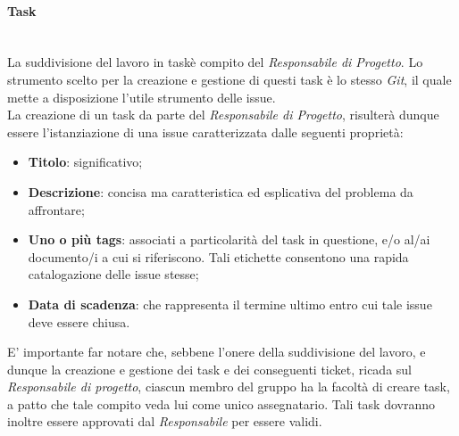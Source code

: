 \paragraph{Task} ~\\
	La suddivisione del lavoro in task\glossario è compito del \textit{Responsabile di Progetto}. Lo strumento scelto per la creazione e gestione di questi task è lo stesso \textit{Git}\glossario, il quale mette a disposizione l'utile strumento delle issue.\\
	La creazione di un task da parte del \textit{Responsabile di Progetto}, risulterà dunque essere l'istanziazione di una issue caratterizzata dalle seguenti proprietà:
	\begin{itemize}
	\item \textbf{Titolo}: significativo;
	\item \textbf{Descrizione}: concisa ma caratteristica ed esplicativa del problema da affrontare;
	\item \textbf{Uno o più tags}: associati a particolarità del task in questione, e/o al/ai documento/i a cui si riferiscono. Tali etichette consentono una rapida catalogazione delle issue stesse;
	\item \textbf{Data di scadenza}: che rappresenta il termine ultimo entro cui tale issue deve essere chiusa.
	\end{itemize}
	E' importante far notare che, sebbene l'onere della suddivisione del lavoro, e dunque la creazione e gestione dei task e dei conseguenti ticket\glossario, ricada sul \textit{Responsabile di progetto}, ciascun membro del gruppo ha la facoltà di creare task, a patto che tale compito veda lui come unico assegnatario. Tali task dovranno inoltre essere approvati dal \textit{Responsabile} per essere validi.

